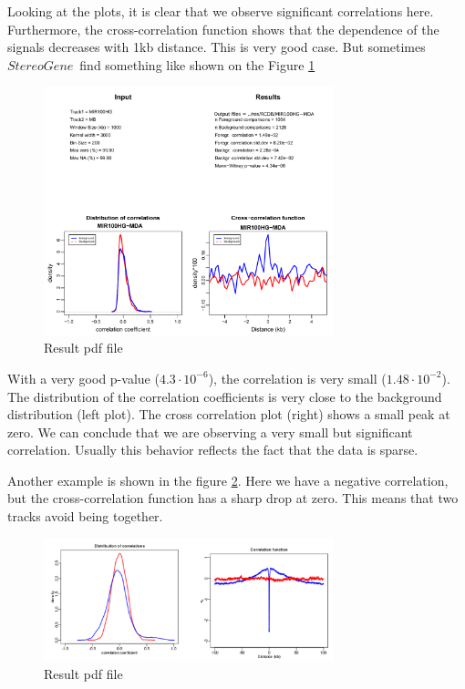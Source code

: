 \documentclass{article}
\newcommand{\tw}{\textwidth}
\newcommand{\sg}{$StereoGene$\ }
\begin{document}
Looking at the plots, it is clear that we observe significant correlations here. Furthermore, the cross-correlation function shows that the dependence of the signals decreases with 1kb distance. This is very good case. 
But sometimes \sg find something like shown on the Figure \ref{res2}

\begin{center}
\begin{figure}[!h]
\includegraphics[width=0.75\tw]{fig/mir100~grid_mda.pdf}
\caption{Result pdf file}\label{res2}
\end{figure}
\end{center}

With a very good p-value ($4.3\cdot 10^{-6}$), the correlation is very small ($1.48\cdot 10^{-2}$). The distribution of the correlation coefficients is very close to the background distribution (left plot). The cross correlation plot (right) shows a small peak at zero. We can conclude that we are observing a very small but significant correlation. 
Usually this behavior reflects the fact that the data is sparse.

Another example is shown in the figure \ref{res3}. Here we have a negative correlation, but the cross-correlation function has a sharp drop at zero. This means that two tracks avoid being together.

\begin{center}
\begin{figure}[!h]
\includegraphics[width=0.75\tw]{fig/corr-ptot3.pdf}
\caption{Result pdf file}\label{res3}
\end{figure}
\end{center}
\end{document}
